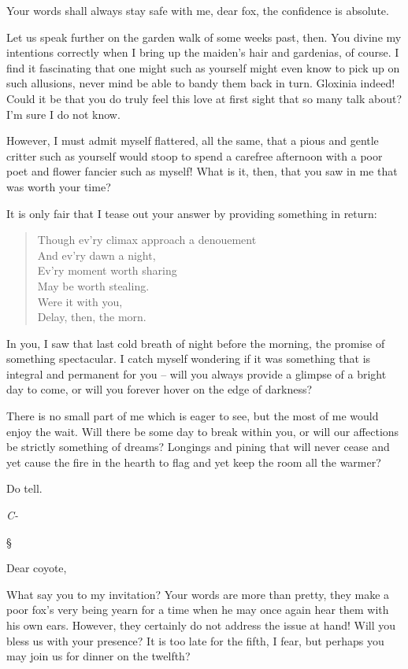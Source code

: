 \documentclass[12pt,letterpaper,oneside]{memoir}
\newcommand\secdiv{
  \begin{center}
    \S
  \end{center}
}
\begin{document}
  Your words shall always stay safe with me, dear fox, the confidence is
  absolute.

  Let us speak further on the garden walk of some weeks past, then. You
  divine my intentions correctly when I bring up the maiden's hair and
  gardenias, of course. I find it fascinating that one might such as
  yourself might even know to pick up on such allusions, never mind be
  able to bandy them back in turn. Gloxinia indeed! Could it be that you
  do truly feel this love at first sight that so many talk about? I'm sure
  I do not know.

  However, I must admit myself flattered, all the same, that a pious and
  gentle critter such as yourself would stoop to spend a carefree
  afternoon with a poor poet and flower fancier such as myself! What is
  it, then, that you saw in me that was worth your time?

  It is only fair that I tease out your answer by providing something in
  return:

  \begin{quote}
  Though ev'ry climax approach a denouement\\
  And ev'ry dawn a night,\\
  Ev'ry moment worth sharing\\
  May be worth stealing.\\
  Were it with you,\\
  Delay, then, the morn.
  \end{quote}

  In you, I saw that last cold breath of night before the morning, the
  promise of something spectacular. I catch myself wondering if it was
  something that is integral and permanent for you -- will you always
  provide a glimpse of a bright day to come, or will you forever hover on
  the edge of darkness?

  There is no small part of me which is eager to see, but the most of me
  would enjoy the wait. Will there be some day to break within you, or
  will our affections be strictly something of dreams? Longings and pining
  that will never cease and yet cause the fire in the hearth to flag and
  yet keep the room all the warmer?

  Do tell.

  \emph{C-}

  \secdiv

  Dear coyote,

  What say you to my invitation? Your words are more than pretty, they
  make a poor fox's very being yearn for a time when he may once again
  hear them with his own ears. However, they certainly do not address the
  issue at hand! Will you bless us with your presence? It is too late for
  the fifth, I fear, but perhaps you may join us for dinner on the
  twelfth?
\end{document}

